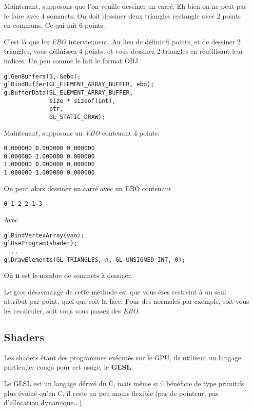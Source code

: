 \documentclass[pdftex, 11pt, a4paper, titlepage]{article}
\begin{document}
Maintenant, supposons que l'on veuille dessiner un carré. Eh bien on
ne peut pas le faire avec 4 sommets, On doit dessiner deux triangles
rectangle avec 2 points en communs. Ce qui fait 6 points.

C'est là que les \emph{EBO} interviennent. Au lieu de définir 6 points, et de
dessiner 2 triangles, vous définissez 4 points, et vous dessinez 2
triangles en réutilisant leur indices. Un peu comme le fait le format
OBJ.

\begin{lstlisting}
glGenBuffers(1, &ebo);
glBindBuffer(GL_ELEMENT_ARRAY_BUFFER, ebo);
glBufferData(GL_ELEMENT_ARRAY_BUFFER,
             size * sizeof(int),
             ptr,
             GL_STATIC_DRAW);
\end{lstlisting}

Maintenant, supposons un \emph{VBO} contenant 4 points:
\begin{verbatim}
0.000000 0.000000 0.000000
0.000000 1.000000 0.000000
1.000000 0.000000 0.000000
1.000000 1.000000 0.000000
\end{verbatim}

On peut alors dessiner un carré avec un EBO contenant

\begin{verbatim}
0 1 2 2 1 3
\end{verbatim}

Avec
\begin{lstlisting}
glBindVertexArray(vao);
glUseProgram(shader);
 ...
glDrawElements(GL_TRIANGLES, n, GL_UNSIGNED_INT, 0);
\end{lstlisting}

Où \textbf{n} est le nombre de sommets à dessiner.

Le gros désavantage de cette méthode est que vous êtes restreint à un
seul attribut par point, quel que soit la face. Pour des normales par
exemple, soit vous les recalculer, soit vous vous passez des \emph{EBO}.

\pagebreak

\subsection{Shaders}

Les shaders étant des programmes exécutés sur le GPU, ils utilisent un
langage particulier conçu pour cet usage, le \textbf{GLSL}.

Le GLSL est un langage dérivé du C, mais même si il bénéficie de type
primitifs plus évolué qu'en C, il reste un peu moins flexible (pas de
pointeur, pas d'allocation dynamique...)
\end{document}
